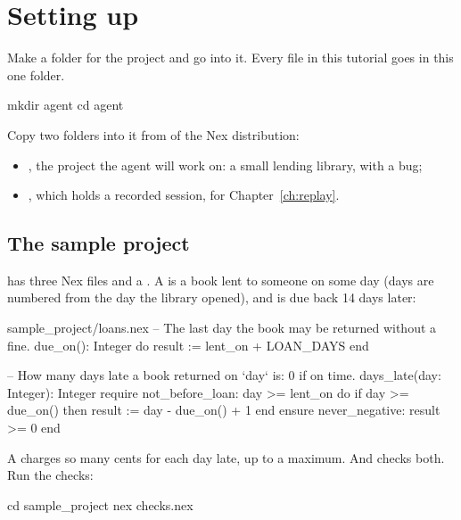 \chapter{Setting up}\label{ch:setup}

Make a folder for the project and go into it. Every file in this tutorial
goes in this one folder.

\begin{shell}
mkdir agent
cd agent
\end{shell}

Copy two folders into it from  of the Nex
distribution:

\begin{itemize}
\item {}, the project the agent will work on: a small
  lending library, with a bug;
\item {}, which holds a recorded session, for
  Chapter~\ref{ch:replay}.
\end{itemize}

\section{The sample project}

 has three Nex files and a . A
 is a book lent to someone on some day (days are numbered from
the day the library opened), and is due back 14 days later:

\begin{excerpt}{sample_project/loans.nex}
  -- The last day the book may be returned without a fine.
  due_on(): Integer do
    result := lent_on + LOAN_DAYS
  end

  -- How many days late a book returned on `day` is: 0 if on time.
  days_late(day: Integer): Integer
  require
    not_before_loan: day >= lent_on
  do
    if day >= due_on() then
      result := day - due_on() + 1
    end
  ensure
    never_negative: result >= 0
  end
\end{excerpt}

A  charges so many cents for each day late, up to a
maximum. And  checks both. Run the checks:

\begin{shell}
cd sample_project
nex checks.nex
\end{shell}

